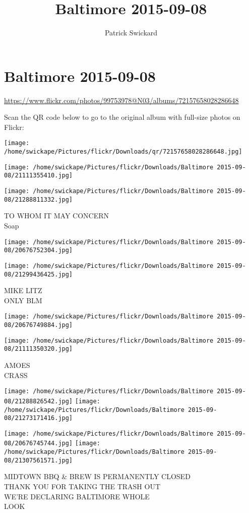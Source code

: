 \documentclass[10pt,letterpaper]{article}
\title{Baltimore 2015-09-08}
\author{Patrick Swickard}
\date{}
\begin{document}
\section*{Baltimore 2015-09-08}

\url{https://www.flickr.com/photos/99753978@N03/albums/72157658028286648}

Scan the QR code below to go to the original album with full-size photos on Flickr:

\texttt{[image: /home/swickape/Pictures/flickr/Downloads/qr/72157658028286648.jpg]}
\pagebreak

\texttt{[image: /home/swickape/Pictures/flickr/Downloads/Baltimore 2015-09-08/21111355410.jpg]}

\vspace{0.25in}
\texttt{[image: /home/swickape/Pictures/flickr/Downloads/Baltimore 2015-09-08/21288811332.jpg]}

TO WHOM IT MAY CONCERN\\
Soap
\pagebreak

\texttt{[image: /home/swickape/Pictures/flickr/Downloads/Baltimore 2015-09-08/20676752304.jpg]}

\vspace{0.25in}
\texttt{[image: /home/swickape/Pictures/flickr/Downloads/Baltimore 2015-09-08/21299436425.jpg]}

MIKE LITZ\\
ONLY BLM
\pagebreak

\texttt{[image: /home/swickape/Pictures/flickr/Downloads/Baltimore 2015-09-08/20676749884.jpg]}

\vspace{0.25in}
\texttt{[image: /home/swickape/Pictures/flickr/Downloads/Baltimore 2015-09-08/21111350320.jpg]}

AMOES\\
CRASS
\pagebreak

\texttt{[image: /home/swickape/Pictures/flickr/Downloads/Baltimore 2015-09-08/21288826542.jpg]}
\texttt{[image: /home/swickape/Pictures/flickr/Downloads/Baltimore 2015-09-08/21273171416.jpg]}

\texttt{[image: /home/swickape/Pictures/flickr/Downloads/Baltimore 2015-09-08/20676745744.jpg]}
\texttt{[image: /home/swickape/Pictures/flickr/Downloads/Baltimore 2015-09-08/21307561571.jpg]}

MIDTOWN BBQ \& BREW IS PERMANENTLY CLOSED\\
THANK YOU FOR TAKING THE TRASH OUT\\
WE'RE DECLARING BALTIMORE WHOLE\\
LOOK
\pagebreak
\end{document}
